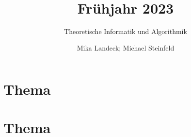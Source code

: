 \documentclass[stex]{ddifau}
\title{Frühjahr 2023}
\subtitle{Theoretische Informatik und Algorithmik}
\author{Mika Landeck; Michael Steinfeld}
\begin{document}
\maketitle
\tableofcontents

\newpage
\section{Thema}

\clearpage

\section{Thema}

\end{document}
